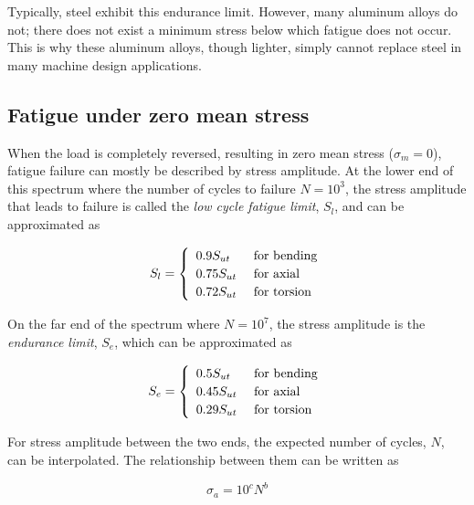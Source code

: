 \documentclass[
10pt,
a4paper,
openany,
svgnames,
]{book}
\begin{document}
Typically, steel exhibit this endurance limit. However, many aluminum alloys do not; there does not exist a minimum stress below which fatigue does not occur. This is why these aluminum alloys, though lighter, simply cannot replace steel in many machine design applications.

\subsection{Fatigue under zero mean stress}

When the load is completely reversed, resulting in zero mean stress ($\sigma_m = 0$), fatigue failure can mostly be described by stress amplitude. At the lower end of this spectrum where the number of cycles to failure $N = 10^3$, the stress amplitude that leads to failure is called the \emph{low cycle fatigue limit}, $S_l$, and can be approximated as

\begin{equation}
  \label{eqn: low cycle fatigue limit}
  S_l = \left\{
    \renewcommand{\arraystretch}{1.2}
    \begin{array}{ll}
      0.9 S_{ut} &\text{ for bending} \\
      0.75 S_{ut} &\text{ for axial} \\
      0.72 S_{ut} &\text{ for torsion}
    \end{array}
  \right.
\end{equation}

On the far end of the spectrum where $N = 10^7$, the stress amplitude is the \emph{endurance limit}, $S_e$, which can be approximated as

\begin{equation}
  \label{eqn: endurance limit}
  S_e = \left\{
    \renewcommand{\arraystretch}{1.2}
    \begin{array}{ll}
      0.5 S_{ut} & \text{ for bending} \\
      0.45 S_{ut} &\text{ for axial} \\
      0.29 S_{ut} &\text{ for torsion}
    \end{array}
  \right.
\end{equation}

For stress amplitude between the two ends, the expected number of cycles, $N$, can be interpolated. The relationship between them can be written as

\begin{equation}
  \sigma_a = 10^cN^b
\end{equation}
\end{document}
